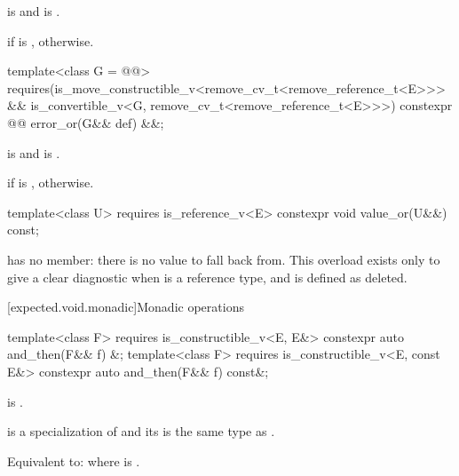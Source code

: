 \begin{itemdescr}
\pnum
\mandates
{} is  and  is .

\pnum
\returns
{} if  is ,  otherwise.
\end{itemdescr}

%
\begin{itemdecl}
template<class G = @@>
  requires(is_move_constructible_v<remove_cv_t<remove_reference_t<E>>> &&
           is_convertible_v<G, remove_cv_t<remove_reference_t<E>>>)
constexpr @@ error_or(G&& def) &&;
\end{itemdecl}

\begin{itemdescr}
\pnum
\mandates
{} is  and  is .

\pnum
\returns
{} if  is ,  otherwise.
\end{itemdescr}

%
\begin{itemdecl}
template<class U>
  requires is_reference_v<E>
constexpr void value_or(U&&) const;
\end{itemdecl}

\begin{itemdescr}
\pnum
\remarks
{} has no  member: there is no value to fall back from. This overload exists only to give a clear diagnostic when  is a reference type, and is defined as deleted.
\end{itemdescr}

[expected.void.monadic]{Monadic operations}

%
\begin{itemdecl}
template<class F>
  requires is_constructible_v<E, E&>
constexpr auto and_then(F&& f) &;
template<class F>
  requires is_constructible_v<E, const E&>
constexpr auto and_then(F&& f) const&;
\end{itemdecl}

\begin{itemdescr}
\pnum
\constraints
{} is .

\pnum
\mandates
{} is a specialization of  and its  is the same type as .

\pnum
\effects
Equivalent to:  where  is .
\end{itemdescr}

